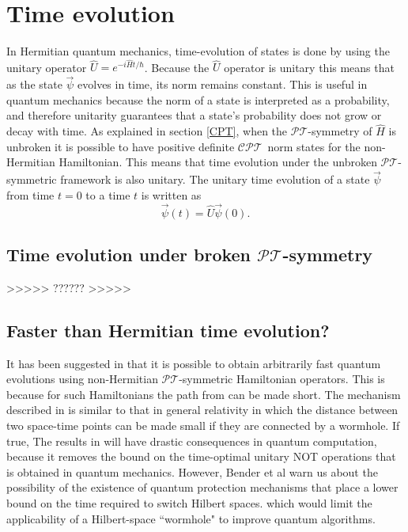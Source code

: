 \documentclass[12pt, a4paper]{report}
\newcommand\PT{\(\mathcal{PT}\)}
\newcommand\CPT{\(\mathcal{CPT}\)}
\begin{document}
\chapter{Time evolution}\label{Tev}
In Hermitian quantum mechanics, time-evolution of states is done by using the unitary operator $\hat{U} = e^{-i\hat{H}t/\hbar}$. Because the $\hat{U}$ operator is unitary this means that as the state $\vec{\psi}$ evolves in time, its norm remains constant. This is useful in quantum mechanics because the norm of a state is interpreted as a probability, and therefore unitarity guarantees that a state's probability does not grow or decay with time. As explained in section \ref{CPT}, when the \PT-symmetry of $\hat{H}$ is unbroken it is possible to have positive definite \CPT norm states for the non-Hermitian Hamiltonian. This means that time evolution under the unbroken \PT-symmetric framework is also unitary\cite{Jones-Smith}\cite{ComplexExtension}\cite{Mostafazadeh2}. 
The unitary time evolution of a state $\vec{\psi}$ from time $t = 0$ to a time $t$ is written as
\begin{equation}\label{}
\vec{\psi}(t) = \hat{U} \vec{\psi}(0).
\end{equation}

\section{Time evolution under broken \PT-symmetry}


>>>>> ?????? >>>>>





\section{Faster than Hermitian time evolution?}\label{faster}
It has been suggested in \cite{Bender_2007} that it is possible to obtain arbitrarily fast quantum evolutions using non-Hermitian \PT-symmetric Hamiltonian operators. This is because for such Hamiltonians the path from can be made short. 
The mechanism described in \cite{Bender_2007} is similar to that in general relativity in which the distance between two space-time points can be made small if they are connected by a wormhole. If true, The results in \cite{Bender_2007} will have drastic consequences in quantum computation, because it removes the bound on the time-optimal unitary NOT operations\cite{OptimalControl} that is obtained in quantum mechanics\cite{Brachistochrone_Mostafazadeh}. However, Bender et al warn us about the possibility of the existence of quantum protection mechanisms that place a lower bound on the time required to switch Hilbert spaces. which would limit the applicability of a Hilbert-space ``wormhole" to improve quantum algorithms\cite{Bender_2007}. 
\end{document}
